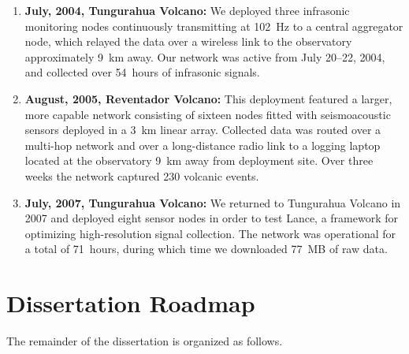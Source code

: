 \begin{enumerate}

\item \textbf{July, 2004, Tungurahua Volcano:} We deployed three infrasonic
monitoring nodes continuously transmitting at 102~Hz to a central aggregator
node, which relayed the data over a wireless link to the observatory
approximately 9~km away.  Our network was active from July 20--22, 2004, and
collected over 54~hours of infrasonic signals.

\item \textbf{August, 2005, Reventador Volcano:} This deployment featured a larger,
more capable network consisting of sixteen nodes fitted with seismoacoustic
sensors deployed in a 3~km linear array.  Collected data was routed over a
multi-hop network and over a long-distance radio link to a logging laptop
located at the observatory 9~km away from deployment site.  Over three weeks
the network captured 230 volcanic events.

\item \textbf{July, 2007, Tungurahua Volcano:} We returned to Tungurahua Volcano in
2007 and deployed eight sensor nodes in order to test Lance, a framework for
optimizing high-resolution signal collection. The network was operational for
a total of 71~hours, during which time we downloaded 77~MB of raw data.

\end{enumerate}

\section{Dissertation Roadmap}

The remainder of the dissertation is organized as follows.

